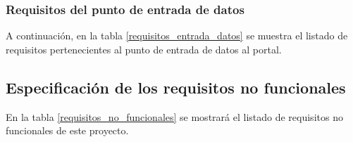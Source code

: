 \subsubsection{Requisitos del punto de entrada de datos}
A continuación, en la tabla \ref{requisitos_entrada_datos} se muestra el listado de requisitos pertenecientes al punto de entrada de datos al portal.



\subsection{Especificación de los requisitos no funcionales}
\label{especificacion_requisitos_no_funcionales}
En la tabla \ref{requisitos_no_funcionales} se mostrará el listado de requisitos no funcionales de este proyecto.
